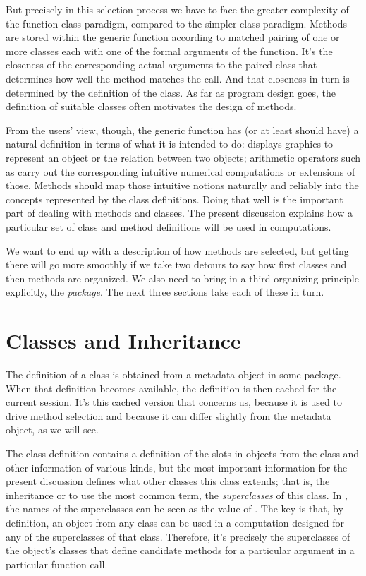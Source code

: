 \documentclass[11pt]{article}
\begin{document}
But precisely in this selection process we have to face the greater complexity of the function-class paradigm, compared to the simpler class paradigm.
Methods are stored within the generic function according to matched pairing of one or more classes each with one of the formal arguments of the function.
It's the closeness of the corresponding actual arguments to the paired class that determines how well the method matches the call.
And that closeness in turn is determined by the definition of the class.
As far as program design goes, the definition of suitable classes often motivates the design of methods.

From the users' view, though, the generic function has (or at least should have) a natural definition in terms of what it is intended to do:   displays graphics to represent an object or the relation between two objects; arithmetic operators such as \SOperator{+} carry out the corresponding intuitive numerical computations or extensions of those.
Methods should map those intuitive notions naturally and reliably into the concepts represented by the class definitions.
Doing that well is the important part of dealing with methods and classes.
The present discussion explains how a particular set of class and method definitions will be used in computations.

We want to end up with a description of how methods are selected, but getting there will go more smoothly if we take two detours to say how first classes  and then  methods are organized.
We also need to bring in a third organizing principle explicitly, the \R{} \emph{package}.
The next three sections take each of these in turn.

\section{Classes and Inheritance}
\label{sec:class-defin-inher}

The definition of a class is obtained from a metadata object in some \R{} package.
When that definition becomes available, the definition is then cached for the current \R{} session.
It's this cached version that concerns us, because it is used to drive method selection and because it can differ slightly from the metadata object, as we will see.

The class definition contains a definition of the slots in objects from the class and other information of various kinds, but the most important information for the present discussion defines what other classes this class extends; that is, the inheritance or to use the most common term, the \emph{superclasses} of this class.
In \R{}, the names of the superclasses can be seen as the value of  .
The key is that, by definition, an object from any class can be used in a computation designed for any of the superclasses of that class.
Therefore, it's precisely the superclasses of the object's classes that define candidate methods for a particular argument in a particular function call.
\end{document}
